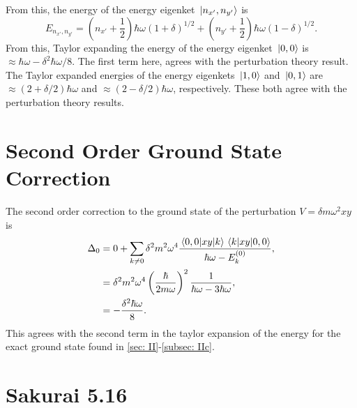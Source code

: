 \documentclass[
a4paper,
10pt,
twoside,
]{article}
\begin{document}
From this, the energy of the energy eigenket $\ket*{n_{x'},n_{y'}}$ is
\begin{equation}
	E_{n_{x'},n_{y'}} = \left(n_{x'}+\frac{1}{2}\right)\hbar\omega(1+\delta)^{1/2}+\left(n_{y'}+\frac{1}{2}\right)\hbar\omega(1-\delta)^{1/2}.
\end{equation}
From this, Taylor expanding the energy of the energy eigenket $\ket*{0,0}$ is $\approx \hbar\omega - \delta^2\hbar\omega/8$.
The first term here, agrees with the perturbation theory result.
The Taylor expanded energies of the energy eigenkets $\ket*{1,0}$ and $\ket*{0,1}$ are $\approx (2+\delta/2)\hbar\omega$ and $\approx (2-\delta/2)\hbar\omega$, respectively.
These both agree with the perturbation theory results.

\section{Second Order Ground State Correction}\label{sec: III}

The second order correction to the ground state of the perturbation $V = \delta m \omega^2 xy$ is
\begin{align}
	\Delta_0 &= 0 + \sum_{k\neq 0} \delta^2m^2\omega^4\frac{\mel*{0,0}{xy}{k}\mel*{k}{xy}{0,0}}{\hbar\omega - E_k^{(0)}},\\
	&= \delta^2 m^2\omega^4\left(\frac{\hbar}{2m\omega}\right)^2\frac{1}{\hbar\omega - 3\hbar\omega},\\
	&= -\frac{\delta^2\hbar\omega}{8}.
\end{align}
This agrees with the second term in the taylor expansion of the energy for the exact ground state found in \ref{sec: II}-\ref{subsec: IIc}.

\section{Sakurai 5.16}\label{sec: IV}



\stopmcols
\end{document}
